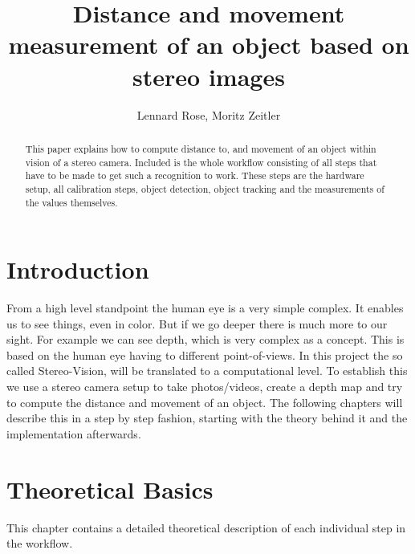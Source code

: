 \documentclass[]{IEEEphot}
\begin{document}
	\title{Distance and movement measurement of an object based on stereo images}

	\author{Lennard Rose, Moritz Zeitler}


	\maketitle



	\begin{abstract}
		This paper explains how to compute distance to, and movement of an object within vision of a stereo camera.
		Included is the whole workflow consisting of all steps that have to be made to get such a recognition to work. These steps are the hardware setup, all calibration steps, object detection, object tracking and the measurements of the values themselves.
	\end{abstract}

	\section{Introduction}
	\label{sec:einfuehrung}
	From a high level standpoint the human eye is a very simple complex. It enables us to see things, even in color. But if we go deeper there is much more to our sight. For example we can see depth, which is very complex as a concept. This is based on the human eye having to different point-of-views. In this project the so called Stereo-Vision, will be translated to a computational level. To establish this we use a stereo camera setup to take photos/videos, create a depth map and try to compute the distance and movement of an object. The following chapters will describe this in a step by step fashion, starting with the theory behind it and the implementation afterwards.

	\section{Theoretical Basics}
	This chapter contains a detailed theoretical description of each individual step in the workflow.
\end{document}
